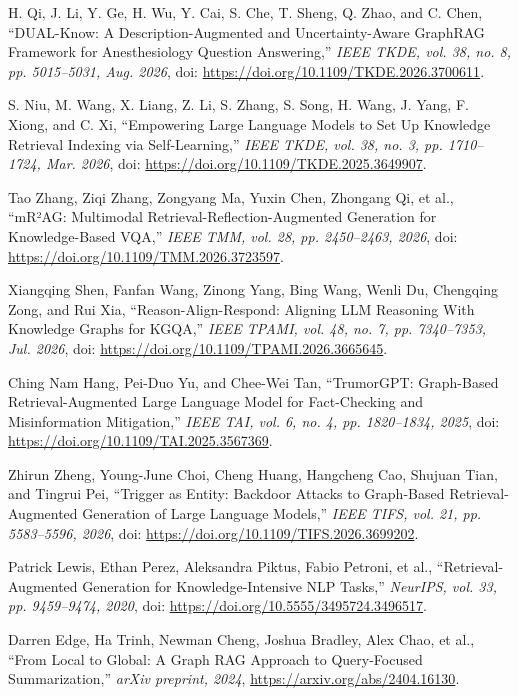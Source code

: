  H. Qi, J. Li, Y. Ge, H. Wu, Y. Cai, S. Che, T. Sheng, Q. Zhao, and C. Chen, ``DUAL-Know: A Description-Augmented and Uncertainty-Aware GraphRAG Framework for Anesthesiology Question Answering,'' \emph{IEEE TKDE, vol. 38, no. 8, pp. 5015--5031, Aug. 2026}, doi: \url{https://doi.org/10.1109/TKDE.2026.3700611}.

 S. Niu, M. Wang, X. Liang, Z. Li, S. Zhang, S. Song, H. Wang, J. Yang, F. Xiong, and C. Xi, ``Empowering Large Language Models to Set Up Knowledge Retrieval Indexing via Self-Learning,'' \emph{IEEE TKDE, vol. 38, no. 3, pp. 1710--1724, Mar. 2026}, doi: \url{https://doi.org/10.1109/TKDE.2025.3649907}.

 Tao Zhang, Ziqi Zhang, Zongyang Ma, Yuxin Chen, Zhongang Qi, et al., ``mR²AG: Multimodal Retrieval-Reflection-Augmented Generation for Knowledge-Based VQA,'' \emph{IEEE TMM, vol. 28, pp. 2450--2463, 2026}, doi: \url{https://doi.org/10.1109/TMM.2026.3723597}.

 Xiangqing Shen, Fanfan Wang, Zinong Yang, Bing Wang, Wenli Du, Chengqing Zong, and Rui Xia, ``Reason-Align-Respond: Aligning LLM Reasoning With Knowledge Graphs for KGQA,'' \emph{IEEE TPAMI, vol. 48, no. 7, pp. 7340--7353, Jul. 2026}, doi: \url{https://doi.org/10.1109/TPAMI.2026.3665645}.

 Ching Nam Hang, Pei-Duo Yu, and Chee-Wei Tan, ``TrumorGPT: Graph-Based Retrieval-Augmented Large Language Model for Fact-Checking and Misinformation Mitigation,'' \emph{IEEE TAI, vol. 6, no. 4, pp. 1820--1834, 2025}, doi: \url{https://doi.org/10.1109/TAI.2025.3567369}.

 Zhirun Zheng, Young-June Choi, Cheng Huang, Hangcheng Cao, Shujuan Tian, and Tingrui Pei, ``Trigger as Entity: Backdoor Attacks to Graph-Based Retrieval-Augmented Generation of Large Language Models,'' \emph{IEEE TIFS, vol. 21, pp. 5583--5596, 2026}, doi: \url{https://doi.org/10.1109/TIFS.2026.3699202}.

 Patrick Lewis, Ethan Perez, Aleksandra Piktus, Fabio Petroni, et al., ``Retrieval-Augmented Generation for Knowledge-Intensive NLP Tasks,'' \emph{NeurIPS, vol. 33, pp. 9459--9474, 2020}, doi: \url{https://doi.org/10.5555/3495724.3496517}.

 Darren Edge, Ha Trinh, Newman Cheng, Joshua Bradley, Alex Chao, et al., ``From Local to Global: A Graph RAG Approach to Query-Focused Summarization,'' \emph{arXiv preprint, 2024}, \url{https://arxiv.org/abs/2404.16130}.

